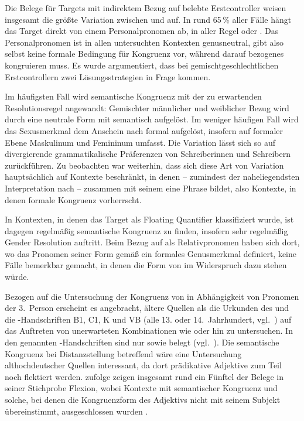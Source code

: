 Die Belege für Targets mit indirektem Bezug auf belebte
Erstcontroller weisen insgesamt die größte Variation zwischen  und
 auf. In rund 65\,\% aller Fälle hängt das Target direkt von einem
Personalpronomen ab, in aller Regel  oder . Das
Personalpronomen ist in allen untersuchten Kontexten genusneutral, gibt also
selbst keine formale Bedingung für Kongruenz vor, während darauf bezogenes
 kongruieren muss. Es wurde argumentiert, dass bei
gemischtgeschlechtlichen Erstcontrollern zwei Lösungsstrategien in Frage
kommen.

Im häufigsten Fall wird semantische Kongruenz mit der zu erwartenden
Resolutionsregel angewandt: Gemischter männlicher und weiblicher Bezug wird
durch eine neutrale Form mit \mbox{} semantisch aufgelöst. Im weniger
häufigen Fall wird das Sexusmerkmal dem Anschein nach formal aufgelöst,
insofern  auf formaler Ebene Maskulinum und Femininum umfasst. Die
Variation lässt sich so auf divergierende grammatikalische Präferenzen von
Schreiberinnen und Schreibern zurück\-führen. Zu beobachten war weiterhin, dass
sich diese Art von Variation hauptsächlich auf Kontexte beschränkt, in denen
 -- zumindest der naheliegendsten Interpretation nach -- zusammen
mit seinem  eine Phrase bildet, also Kontexte, in denen formale
Kongruenz vorherrscht.

In Kontexten, in denen das Target als Floating Quantifier klassifiziert wurde,
ist dagegen regelmäßig semantische Kongruenz zu finden, insofern sehr
regelmäßig Gender Resolution auftritt. Beim Bezug auf  als
Relativpronomen haben sich dort, wo das Pronomen seiner Form gemäß ein formales
Genusmerkmal definiert, keine Fälle bemerkbar gemacht, in denen die Form von
 im Widerspruch dazu stehen würde.

Bezogen auf die Untersuchung der Kongruenz von  in Abhängigkeit von
Pro\-nomen der 3.~Person erscheint es angebracht, ältere Quellen als die
Urkunden des \CAO{} und die \KC{}-Handschriften B1, C1, K und VB (alle 13. oder
14.~Jahrhundert, vgl.~) auf das Auftreten von unerwarteten
Kombinationen wie  oder  hin zu untersuchen.
In den genannten \KC{}-Handschriften sind nur  sowie
 belegt (vgl.~). Die
semantische Kongruenz bei Distanz\-stellung betreffend wäre eine Untersuchung
althochdeutscher Quellen interessant, da dort prädikative
Adjektive zum Teil noch flektiert werden.
\citet[310--311]{fleischer2007} zufolge zeigen insgesamt rund ein Fünftel der
Belege in seiner Stichprobe Flexion, wobei Kontexte mit semantischer Kongruenz
und solche, bei denen die Kongruenzform des Adjektivs
nicht mit seinem Subjekt übereinstimmt, ausgeschlossen wurden
\autocite[304]{fleischer2007}.

